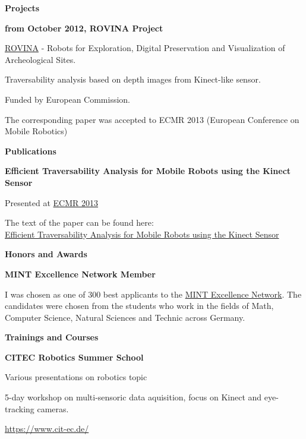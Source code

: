 \documentclass[a4paper,12pt,final]{memoir}
\newcommand{\Sep}{\vspace{1.5em}}
\newcommand{\SmallSep}{\vspace{0.5em}}
\newcommand{\CVSection}[1]
	{\Large\textbf{#1}\par
	\SmallSep\normalsize\normalfont}
\newcommand{\CVItem}[1]
	{\textbf{\color{MidnightBlue} #1}}
\begin{document}
\CVSection{Projects}
\CVItem{from October 2012, ROVINA Project}
\begin{compactitem}[\color{MidnightBlue}$\circ$]
	\item \href{http://www.rovina-project.eu/}{ROVINA}  - Robots for Exploration, Digital Preservation and Visualization of Archeological Sites.
	\item Traversability analysis based on depth images from Kinect-like sensor.
	\item Funded by European Commission.
	\item The corresponding paper was accepted to ECMR 2013 (European Conference on Mobile Robotics)
\end{compactitem}
\SmallSep

\CVSection{Publications}
\CVItem{Efficient Traversability Analysis for Mobile Robots using the Kinect Sensor}
\begin{compactitem}[\color{MidnightBlue}$\circ$]
	\item Presented at \href{http://www.iri.upc.edu/ecmr13/#home}{ECMR 2013}
	\item The text of the paper can be found here: \\\href{http://www.informatik.uni-freiburg.de/~stachnis/pdf/bogoslavskyi13ecmr.pdf}{Efficient Traversability Analysis for Mobile Robots using the Kinect Sensor}
\end{compactitem}
\SmallSep

\CVSection{Honors and Awards}
\CVItem{MINT Excellence Network Member}
\begin{compactitem}[\color{MidnightBlue}$\circ$]
	\item I was chosen as one of 300 best applicants to the \href{http://www.mlp.de/#/studenten/karriere/stipendienprogramme/mint-excellence}{MINT Excellence Network}. The candidates were chosen from the students who work in the fields of Math, Computer Science, Natural Sciences and Technic across Germany.
\end{compactitem}
\Sep

\framebreak
\clearpage
\framebreak
\framebreak

\CVSection{Trainings and Courses}
\CVItem{CITEC Robotics Summer School}
\begin{compactitem}[\color{MidnightBlue}$\circ$]
	\item Various presentations on robotics topic
	\item 5-day workshop on multi-sensoric data aquisition, focus on Kinect and eye-tracking cameras.
	\item \href{https://www.cit-ec.de/}{https://www.cit-ec.de/}
\end{compactitem}
\SmallSep
\end{document}

